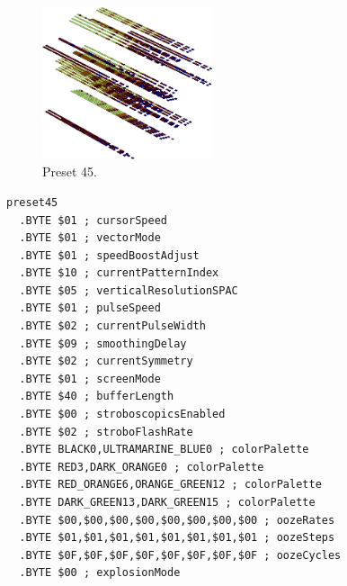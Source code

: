 \clearpage
\begin{minipage}[b]{0.48\linewidth}
\begin{figure}[H]                                                          
  \centering                                                             
  \begin{adjustbox}{width=5cm,center}                                   
  \includegraphics[width=5cm]{src/colorspace_presets/preset45-45.png}%
  \end{adjustbox}                                                        
\caption*{Preset 45.}                                           
\end{figure}                                                               
\end{minipage}
\hspace{0.1cm}
\begin{minipage}[b]{0.48\linewidth}                            
\begin{lstlisting}[basicstyle=\ttfamily\tiny]
preset45
  .BYTE $01 ; cursorSpeed
  .BYTE $01 ; vectorMode
  .BYTE $01 ; speedBoostAdjust
  .BYTE $10 ; currentPatternIndex
  .BYTE $05 ; verticalResolutionSPAC
  .BYTE $01 ; pulseSpeed
  .BYTE $02 ; currentPulseWidth
  .BYTE $09 ; smoothingDelay
  .BYTE $02 ; currentSymmetry
  .BYTE $01 ; screenMode
  .BYTE $40 ; bufferLength
  .BYTE $00 ; stroboscopicsEnabled
  .BYTE $02 ; stroboFlashRate
  .BYTE BLACK0,ULTRAMARINE_BLUE0 ; colorPalette
  .BYTE RED3,DARK_ORANGE0 ; colorPalette
  .BYTE RED_ORANGE6,ORANGE_GREEN12 ; colorPalette
  .BYTE DARK_GREEN13,DARK_GREEN15 ; colorPalette
  .BYTE $00,$00,$00,$00,$00,$00,$00,$00 ; oozeRates
  .BYTE $01,$01,$01,$01,$01,$01,$01,$01 ; oozeSteps
  .BYTE $0F,$0F,$0F,$0F,$0F,$0F,$0F,$0F ; oozeCycles
  .BYTE $00 ; explosionMode
\end{lstlisting}
\end{minipage}

\vspace*{0.3cm}

